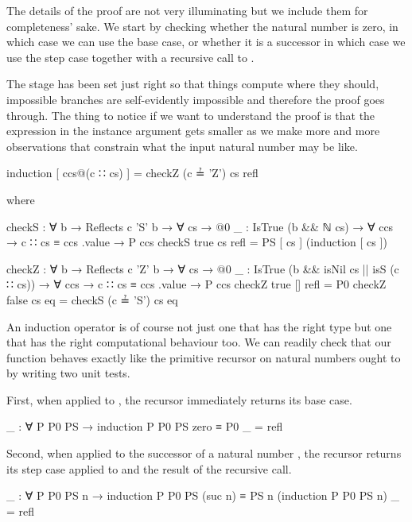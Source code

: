 \documentclass[twocolumn]{article}
\begin{document}
The details of the proof are not very illuminating but we include them for
completeness' sake. We start by checking
whether the natural number is zero, in which case we can use the base case,
or whether it is a successor in which case we use the step case together
with a recursive call to .

The stage has been set just right so that things compute where they should,
impossible branches are self-evidently impossible and therefore the proof
goes through. The thing to notice if we want to understand the proof is that
the expression in the  instance argument gets smaller as we make
more and more observations that constrain what the input natural number may
be like.

\begin{code}
  induction [ ccs@(c ∷ cs) ] = checkZ (c ≟ 'Z') cs refl

    where

    checkS : ∀ {b} → Reflects c 'S' b → ∀ cs →
      {{@0 _ : IsTrue (b && ℕ cs)}} →
      ∀ {ccs} → c ∷ cs ≡ ccs .value → P ccs
    checkS true cs refl = PS [ cs ] (induction [ cs ])

    checkZ : ∀ {b} → Reflects c 'Z' b → ∀ cs →
      {{@0 _ : IsTrue (b && isNil cs || isS (c ∷ cs))}} →
      ∀ {ccs} → c ∷ cs ≡ ccs .value → P ccs
    checkZ true  [] refl = P0
    checkZ false cs eq   = checkS (c ≟ 'S') cs eq
\end{code}

An induction operator is of course not just one that has
the right type but one that has the right computational behaviour too.
We can readily check that our  function behaves exactly
like the primitive recursor on natural numbers ought to by writing two
unit tests.

First, when applied to , the recursor immediately returns
its base case.

\begin{code}
_ : ∀ {P P0 PS} → induction P P0 PS zero ≡ P0
_ = refl
\end{code}

Second, when applied to the successor of a natural number , the
recursor returns its step case applied to  and the result of the
recursive call.

\begin{code}
_ : ∀ {P P0 PS n} →
    induction P P0 PS (suc n)
    ≡ PS n (induction P P0 PS n)
_ = refl
\end{code}
\end{document}
